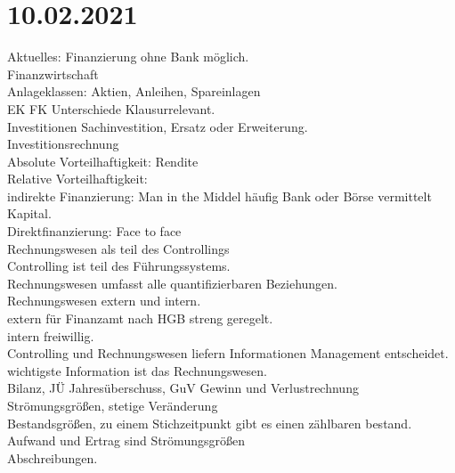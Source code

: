 \documentclass{article}
\begin{document}
	\section*{10.02.2021}
	Aktuelles: Finanzierung ohne Bank möglich. \\
	Finanzwirtschaft \\
	Anlageklassen: Aktien, Anleihen, Spareinlagen \\
	EK FK Unterschiede Klausurrelevant. \\
	Investitionen Sachinvestition, Ersatz oder Erweiterung. \\
	Investitionsrechnung \\
	Absolute Vorteilhaftigkeit: Rendite \\
	Relative Vorteilhaftigkeit:  \\
	indirekte Finanzierung: Man in the Middel häufig Bank oder Börse vermittelt Kapital. \\
	Direktfinanzierung: Face to face \\
	Rechnungswesen als teil des Controllings \\
	Controlling ist teil des Führungssystems. \\
	Rechnungswesen umfasst alle quantifizierbaren Beziehungen. \\
	Rechnungswesen extern und intern. \\
	extern für Finanzamt nach HGB streng geregelt. \\
	intern freiwillig. \\
	Controlling und Rechnungswesen liefern Informationen Management entscheidet. \\
	wichtigste Information ist das Rechnungswesen. \\
	Bilanz, JÜ Jahresüberschuss, GuV Gewinn und Verlustrechnung \\
	Strömungsgrößen, stetige Veränderung \\
	Bestandsgrößen, zu einem Stichzeitpunkt gibt es einen zählbaren bestand. \\
	Aufwand und Ertrag sind Strömungsgrößen \\
	Abschreibungen. \\
	
\end{document}
